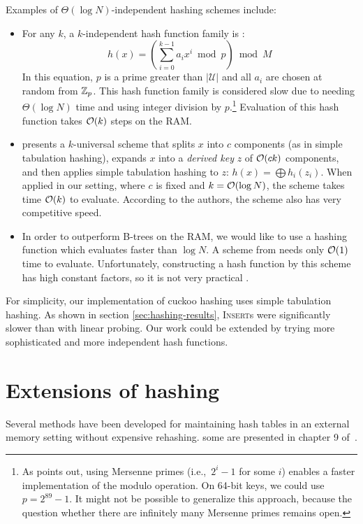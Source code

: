 Examples of $\Theta(\log N)$-independent hashing schemes include:
\begin{itemize}
\item	For any $k$, a $k$-independent hash function family is \cite{new-hash-fns}:
	$$h(x)=\left(\sum_{i=0}^{k-1} a_i x^i \bmod p\right) \bmod M$$
	In this equation, $p$ is a prime greater than $|\mathcal{U}|$
	and all $a_i$ are chosen at random from $\mathbb{Z}_p$.
	This hash function family is considered slow due to needing
	$\Theta(\log N)$ time and using integer division by $p$.\footnote{%
		As \cite{univ-classes} points out, using Mersenne primes
		(i.e.,\ $2^i-1$ for some $i$) enables a faster implementation of
		the modulo operation. On 64-bit keys, we could use $p=2^{89}-1$.
		It might not be possible to generalize this approach, because
		the question whether there are infinitely many Mersenne primes
		remains open.
	}
	Evaluation of this hash function takes $\mathcal{O}(k)$ steps on the RAM.
\item \cite{tab-based-4uni-hashing} presents a $k$-universal scheme that splits
	$x$ into $c$ components (as in simple tabulation hashing),
	expands $x$ into a \emph{derived key} $z$ of $\mathcal{O}(ck)$ components,
	and then applies simple tabulation hashing to $z$:
	$h(x)=\bigoplus h_i(z_i)$.
	When applied in our setting, where $c$ is fixed and $k=\mathcal{O}(\log N)$,
	the scheme takes time $\mathcal{O}(k)$ to evaluate.
	According to the authors, the scheme also has very competitive speed.
\item In order to outperform B-trees on the RAM, we would like to use a hashing
	function which evaluates faster than $\log N$. A scheme from
	\cite{univ-ext-random} needs only $\mathcal{O}(1)$ time to evaluate. Unfortunately,
	constructing a hash function by this scheme has high constant
	factors, so it is not very practical \cite{pagh-phd}.
\end{itemize}


For simplicity, our implementation of cuckoo hashing uses simple tabulation
hashing. As shown in section \ref{sec:hashing-results}, \textsc{Insert}s were
significantly slower than with linear probing. Our work could be extended by
trying more sophisticated and more independent hash functions.

\section{Extensions of hashing}
Several methods have been developed for maintaining hash tables in an external
memory setting without expensive rehashing. some are presented in chapter 9
of~\cite{em-ads}.

